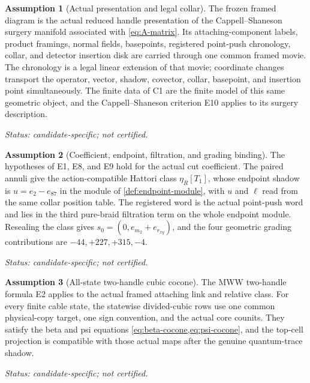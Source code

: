 \documentclass[10pt,reqno]{amsart}
\theoremstyle{definition}
\newtheorem{assumption}{Assumption}
\theoremstyle{remark}
\newcommand{\Status}[1]{\par\smallskip\noindent\textit{Status: #1.}\par\smallskip}
\newcommand{\UncertifiedStatus}{candidate-specific; not certified}
\begin{document}
\begin{assumption}[Actual presentation and legal collar]\label{ass:G1}
\label{ass:actual-presentation}\label{ass:serialization}\label{ass:collar}
\label{ass:cs-topology}
The frozen framed diagram is the actual reduced handle presentation of the
Cappell--Shaneson surgery manifold associated with \cref{eq:A-matrix}.  Its
attaching-component labels, product framings, normal fields, basepoints,
registered point-push chronology, collar, and detector insertion disk are
carried through one common framed movie.  The chronology is a legal linear
extension of that movie; coordinate changes transport the operator, vector,
shadow, covector, collar, basepoint, and insertion point simultaneously.
The finite data of C1 are the finite model of this same geometric object, and
the Cappell--Shaneson criterion E10 applies to its surgery description.
\Status{\UncertifiedStatus}
\end{assumption}

\begin{assumption}[Coefficient, endpoint, filtration, and grading binding]\label{ass:G2}
\label{ass:mww-one-handle}\label{ass:strict-functoriality}
\label{ass:quantum-trace}\label{ass:hattori-binding}
\label{ass:word-filtration}\label{ass:raw-state}
The hypotheses of E1, E8, and E9 hold for the actual cut coefficient.  The paired
annuli give the action-compatible Hattori class $\eta_R[T_1]$, whose endpoint
shadow is $u=e_2-e_{87}$ in the module of \cref{def:endpoint-module}, with
$u$ and $\ell$ read from the same collar position table.  The
registered word is the actual point-push word and lies in the third
pure-braid filtration term on the whole endpoint module.  Resealing the class
gives $s_0=(0,e_{m_2}+e_{r_{xy}})$, and the four geometric grading
contributions are $-44,+227,+315,-4$.
\Status{\UncertifiedStatus}
\end{assumption}

\begin{assumption}[All-state two-handle cubic cocone]\label{ass:G3}
\label{ass:mww-two-handle}\label{ass:two-handle-cocone}
The MWW two-handle formula E2 applies to the actual framed attaching link and
relative class.  For every finite cable state, the statewise divided-cubic
rows use one common physical-copy target, one sign convention, and the actual
core counits.  They satisfy the beta and psi equations
\cref{eq:beta-cocone,eq:psi-cocone}, and the top-cell projection is compatible
with those actual maps after the genuine quantum-trace shadow.
\Status{\UncertifiedStatus}
\end{assumption}
\end{document}
